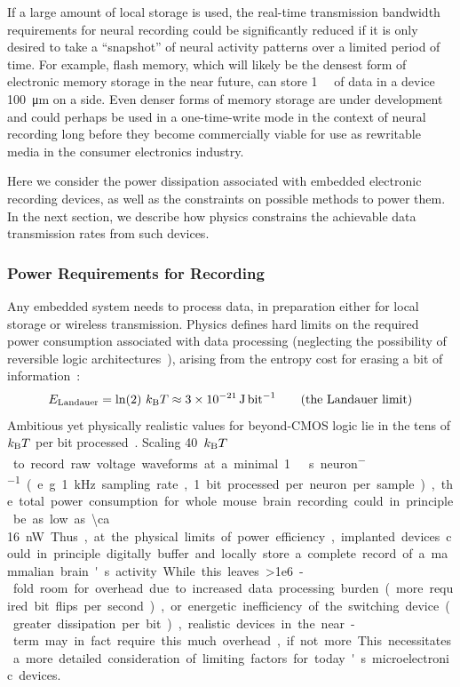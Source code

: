 If a large amount of local storage is used, the real-time transmission bandwidth requirements for neural recording could be significantly reduced if it is only desired to take a ``snapshot'' of neural activity patterns over a limited period of time.
For example, flash memory, which will likely be the densest form of electronic memory storage in the near future, can store \SI{1}{\mega\bit} of data in a device \SI{100}{\micro\meter} on a side.
Even denser forms of memory storage are under development and could perhaps be used in a one-time-write mode in the context of neural recording long before they become commercially viable for use as rewritable media in the consumer electronics industry.

Here we consider the power dissipation associated with embedded electronic recording devices, as well as the constraints on possible methods to power them.
In the next section, we describe how physics constrains the achievable data transmission rates from such devices.

\subsubsection{Power Requirements for Recording}

Any embedded system needs to process data, in preparation either for local storage or wireless transmission.
Physics defines hard limits on the required power consumption associated with data processing (neglecting the possibility of reversible logic architectures~\cite{bennett73}), arising from the entropy cost for erasing a bit of information~\cite{landauer61}:
\[E\sub{Landauer} = \ln(2)\ \kb T\approx \SI{3e-21}{\joule\per\bit} \tag{the Landauer limit}\]
Ambitious yet physically realistic values for beyond-CMOS logic lie in the tens of $k_{\text{\scriptsize B}} T$ per bit processed~\cite{yablonovitch08}.
Scaling \SI{40}{$k_{\text{\scriptsize B}} T$\per\bit} to record raw voltage waveforms at a minimal \SI{1}{\kilo\bit\per\second\per neuron} (e.g. \SI{1}{\kilo\hertz} sampling rate, 1 bit processed per neuron per sample), the total power consumption for whole mouse brain recording could in principle be as low as \SI{\ca 16}{\nano\watt}.
Thus, at the physical limits of power efficiency, implanted devices could in principle digitally buffer and locally store a complete record of a mammalian brain's activity.
While this leaves \num{>1e6}-fold room for overhead due to increased data processing burden (more required bit flips per second), or energetic inefficiency of the switching device (greater dissipation per bit), realistic devices in the near-term may in fact require this much overhead, if not more.
This necessitates a more detailed consideration of limiting factors for today's microelectronic devices.

